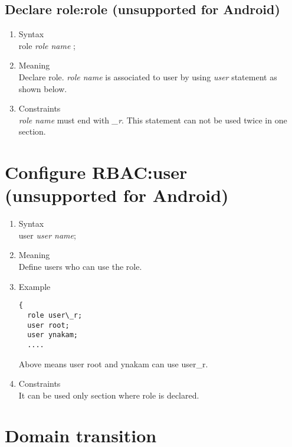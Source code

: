 \documentclass{article}
\begin{document}
\subsection{Declare role:role (unsupported for Android)}
\begin{enumerate}
 \item Syntax\\
    role {\it  role name } ;
 \item Meaning\\
     Declare role.  {\it  role name } is associated to user by using
       {\it user} statement as shown below.
 \item Constraints\\
       {\it role name} must end with {\it \_r}. This statement can not be used twice in one section. 
\end{enumerate}

\section{Configure RBAC:user (unsupported for Android)}
\begin{enumerate}
 \item Syntax\\
       user {\it user name};
 \item Meaning\\
       Define users who can use the role. 
 \item Example\\
\begin{verbatim}
{
  role user\_r;
  user root;
  user ynakam;
  ....
\end{verbatim}
Above means user root and ynakam can use user\_r.
\item Constraints\\
       It can be used only section where role is declared. 

\end{enumerate}

\section{Domain transition}
\end{document}
